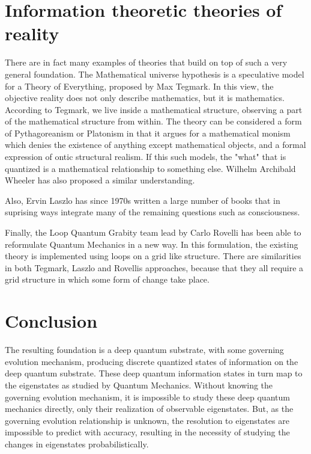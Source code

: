 \documentclass[notitlepage]{report}
\begin{document}
\section*{Information theoretic theories of reality}

There are in fact many examples of theories that build on top of such a very general foundation. The Mathematical universe hypothesis is a speculative model for a Theory of Everything, proposed by Max Tegmark. In this view, the objective reality does not only describe mathematics, but it is mathematics. According to Tegmark, we live inside a mathematical structure, observing a part of the mathematical structure from within. The theory can be considered a form of Pythagoreanism or Platonism in that it argues for a mathematical monism which denies the existence of anything except mathematical objects, and a formal expression of ontic structural realism. If this such models,  the "what" that is quantized is a mathematical relationship to something else. Wilhelm Archibald Wheeler has also proposed a similar understanding. 

Also, Ervin Laszlo has since 1970s written a large number of books that in suprising ways integrate many of the remaining questions such as consciousness. 

Finally, the Loop Quantum Grabity team lead by Carlo Rovelli has been able to reformulate Quantum Mechanics in a new way. In this formulation, the existing theory is implemented using loops on a grid like structure. There are similarities in both Tegmark, Laszlo and Rovellis approaches, because that they all require a grid structure in which some form of change take place. 

\section*{Conclusion }
The resulting foundation is a deep quantum substrate, with some governing evolution mechanism, producing discrete quantized states of information on the deep quantum substrate. These deep quantum information states in turn map to the eigenstates as studied by Quantum Mechanics. Without knowing the governing evolution mechanism, it is impossible to study these deep quantum mechanics directly, only their realization of observable eigenstates. But, as the governing evolution relationship is unknown, the resolution to eigenstates are impossible to predict with accuracy, resulting in the necessity of studying the changes in eigenstates probabilistically.
\end{document}
